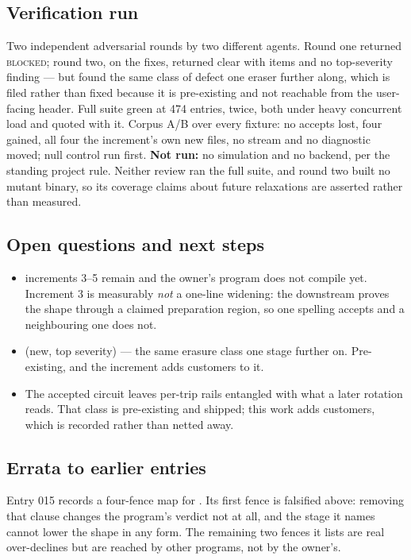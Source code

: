 \subsection*{Verification run}
Two independent adversarial rounds by two different agents. Round one returned \textsc{blocked};
round two, on the fixes, returned clear with items and no top-severity finding --- but found the same
class of defect one eraser further along, which is filed rather than fixed because it is pre-existing
and not reachable from the user-facing header. Full suite green at 474 entries, twice, both under
heavy concurrent load and quoted with it. Corpus A/B over every fixture: no accepts lost, four gained,
all four the increment's own new files, no stream and no diagnostic moved; null control run first.
\textbf{Not run:} no simulation and no backend, per the standing project rule. Neither review ran the
full suite, and round two built no mutant binary, so its coverage claims about future relaxations are
asserted rather than measured.

\subsection*{Open questions and next steps}
\begin{itemize}
  \item {} increments 3--5 remain and the owner's program does not compile yet. Increment 3 is
        measurably \emph{not} a one-line widening: the downstream proves the shape through a claimed
        preparation region, so one spelling accepts and a neighbouring one does not.
  \item {} (new, top severity) --- the same erasure class one stage further on. Pre-existing,
        and the increment adds customers to it.
  \item The accepted circuit leaves per-trip rails entangled with what a later rotation reads. That
        class is pre-existing and shipped; this work adds customers, which is recorded rather than
        netted away.
\end{itemize}

\subsection*{Errata to earlier entries}
Entry 015 records a four-fence map for . Its first fence is falsified above: removing that
clause changes the program's verdict not at all, and the stage it names cannot lower the shape in any
form. The remaining two fences it lists are real over-declines but are reached by other programs, not
by the owner's.
